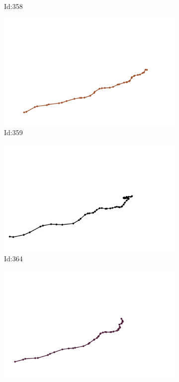 \documentclass[12pt,twoside]{report}
\begin{document}
\begin{figure}
\begin{subfigure}[b]{0.20\textwidth}
\caption{Id:358}
\end{subfigure}
\begin{subfigure}[b]{0.20\textwidth}
\centering
\includegraphics[width=\textwidth]{../trajectories/359.png}
\caption{Id:359}
\end{subfigure}
\begin{subfigure}[b]{0.20\textwidth}
\centering
\includegraphics[width=\textwidth]{../trajectories/364.png}
\caption{Id:364}
\end{subfigure}
\begin{subfigure}[b]{0.20\textwidth}
\centering
\includegraphics[width=\textwidth]{../trajectories/365.png}

\end{subfigure}
\end{figure}
\end{document}
